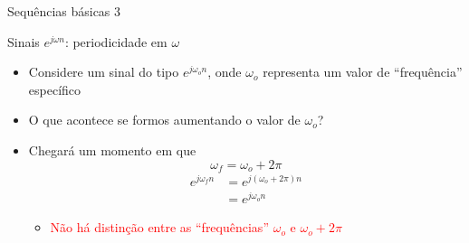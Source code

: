 \documentclass[
size=17pt,
paper=smartboard,
mode=present,
display=slidesnotes,
style=sailor,
nopagebreaks,
blackslide,
fleqn]{powerdot}
\begin{document}
\begin{slide}{Sequências básicas 3}
\begin{itemize}
       \end{itemize}
\end{slide}

 \begin{slide}{Sinais $e^{j\omega n}$: periodicidade em $\omega$ }
    \begin{itemize}
     \item <1-4> Considere um sinal do tipo $e^{j\omega_o n}$, onde $\omega_o$ representa um valor de ``frequência'' específico
     \item <2-4> O que acontece se formos aumentando o valor de $\omega_o$?
     \item <3-4> Chegará um momento em que 
        \begin{equation*}
             \omega_f = \omega_o + 2\pi
        \end{equation*}
        \begin{equation*}
        \begin{split}
           e^{j\omega_f n} & = e^{j(\omega_o + 2\pi)n} \\
                           &=e^{j\omega_o n}
         \end{split}
        \end{equation*}
        \begin{itemize}
           \item <4>\textcolor{red}{Não há distinção entre as ``frequências'' $\omega_o$ e $\omega_o+2\pi$}
     \end{itemize}
   \end{itemize}
 \end{slide}
 
\end{document}
